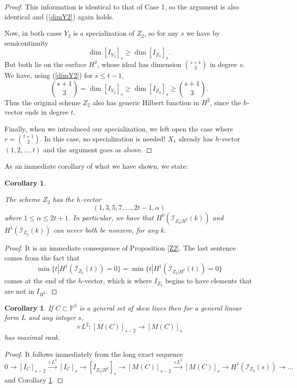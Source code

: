 \documentclass[12pt]{amsart}%
\numberwithin{equation}{section}
\newtheorem{corollary}[theorem]{Corollary}
\theoremstyle{definition}
\numberwithin{equation}{section}
\begin{document}
\begin{proof}
This information is identical to that of Case 1, so the argument is also identical and (\ref{dimY2}) again holds.

Now, in both cases $Y_2$ is a specialization of $Z_2$, so for any $s$ we have by semicontinuity
\[
\dim [I_{Y_2}]_s \geq \dim [I_{Z_2}]_s .
\]
But both lie on the surface $H^2$, whose ideal has dimension $\binom{s+1}{3}$ in degree $s$. We have, using (\ref{dimY2}) for $s \leq t-1$, 
\[
\binom{s+1}{3} = \dim [I_{Y_2}]_s \geq \dim [I_{Z_2}]_s \geq \binom{s+1}{3}.
\]
Thus the original scheme $Z_2$ also has generic Hilbert function in $H^2$, since the $h$-vector ends in degree $t$.

Finally, when we introduced our specialization, we left open the case where $r = \binom{t+1}{2}$. In this case, no specialization is needed! $X_1$ already has $h$-vector $(1,2,\dots,t)$ and the argument goes as above.
\end{proof}

As an immediate corollary of what we have shown, we state:

\begin{corollary} \label{cor: genHF}
    
    The scheme $Z_2$ has the  $h$-vector 
    \[
    (1,3,5,7,\dots, 2t-1,\alpha)
    \]
    where $1 \leq \alpha \leq 2t+1$. In particular, we have that $H^0(\mathcal I_{Z_2 |H^2}(k))$ and $H^1(\mathcal I_{Z_2}(k))$ can never both be nonzero, for any $k$.  
\end{corollary}

\begin{proof}
    It is an immediate consequence of Proposition \ref{Z2}.
    The last sentence comes from the fact that 
    \[
   \min \{ t | H^1(\mathcal I_{Z_2}(t)) = 0 \} =  \min \{ t | H^1(\mathcal I_{Z_2|H^2}(t)) = 0 \} 
\]
comes at the end of the $h$-vector, which is where $I_{Z_2}$ begins to have elements that are not in $I_{H^2}$.
\end{proof}

\begin{corollary}\label{SLP2}
    If $C \subset \mathbb P^3$ is a general set of skew lines then for a general linear form $L$ and any integer $s$,
    \[
    \times L^2 \colon [M(C)]_{s-2} \rightarrow  [M(C)]_s
    \]
     has maximal rank.
\end{corollary}

\begin{proof}
  It follows immediately from the long exact sequence
  \[
  0 \rightarrow [I_C]_{s-2} \stackrel{\times L^2}{\longrightarrow} [I_C]_s \rightarrow [I_{Z_2 | H^2}]_s \rightarrow [M(C)]_{s-2} \stackrel{\times L^2}{\longrightarrow} [M(C)]_s \rightarrow H^1(\mathcal I_{Z_2} (s)) \rightarrow \dots
  \]
  and Corollary \ref{cor: genHF}.
\end{proof}
\end{document}
